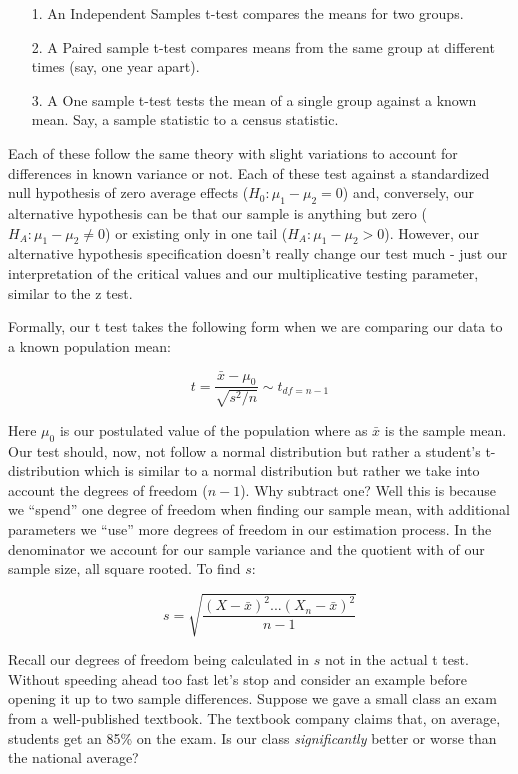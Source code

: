 \documentclass[12pt]{article}\usepackage[]{graphicx}\usepackage[]{color}
\begin{document}
\begin{flushleft}
\begin{itemize}
\item[1.] An Independent Samples t-test compares the means for two groups.
\item[2.] A Paired sample t-test compares means from the same group at different times (say, one year apart).
\item[3.] A One sample t-test tests the mean of a single group against a known mean. Say, a sample statistic to a census statistic.
\end{itemize}

Each of these follow the same theory with slight variations to account for differences in known variance or not. Each of these test against a standardized null hypothesis of zero average effects ($ H_0 : \mu_1 - \mu_2 = 0$) and, conversely, our alternative hypothesis can be that our sample is anything but zero ($H_A : \mu_1 - \mu_2 \neq 0$) or existing only in one tail ($H_A : \mu_1 - \mu_2 > 0$). However, our alternative hypothesis specification doesn't really change our test much - just our interpretation of the critical values and our multiplicative testing parameter, similar to the z test.

Formally, our t test takes the following form when we are comparing our data to a known population mean:

$$ t = \frac{\bar{x} - \mu_0}{\sqrt{s^2 / n}} \sim t_{df=n-1} $$

Here $\mu_0$ is our postulated value of the population where as $\bar{x}$ is the sample mean. Our test should, now, not follow a normal distribution but rather a student's t-distribution which is similar to a normal distribution but rather we take into account the degrees of freedom ($n-1$). Why subtract one? Well this is because we ``spend'' one degree of freedom when finding our sample mean, with additional parameters we ``use'' more degrees of freedom in our estimation process. In the denominator we account for our sample variance and the quotient with of our sample size, all square rooted. To find $s$:

$$s = \sqrt{\frac{(X-\bar{x})^2 \text{...} (X_n - \bar{x})^2 }{n-1} } $$

Recall our degrees of freedom being calculated in $s$ not in the actual t test. Without speeding ahead too fast let's stop and consider an example before opening it up to two sample differences. Suppose we gave a small class an exam from a well-published textbook. The textbook company claims that, on average, students get an 85\% on the exam. Is our class \textit{significantly} better or worse than the national average?


\end{flushleft}
\end{document}
